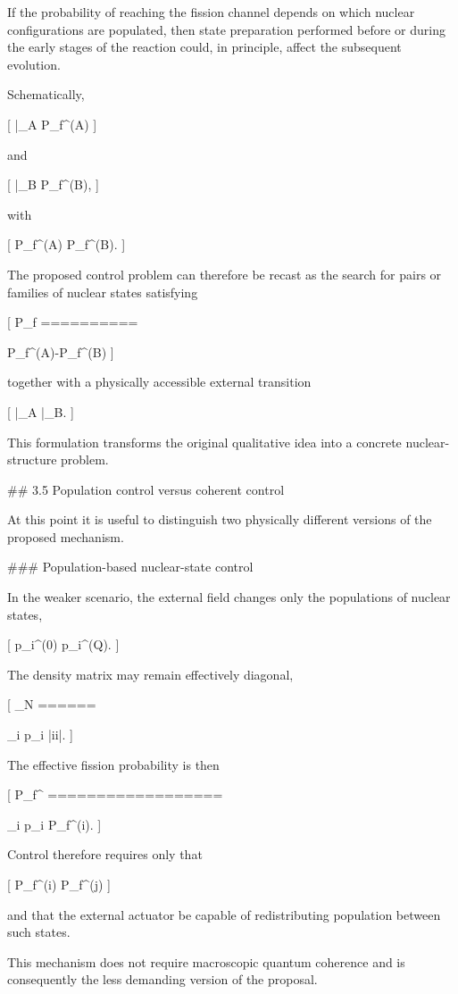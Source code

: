 If the probability of reaching the fission channel depends on which nuclear configurations are populated, then state preparation performed before or during the early stages of the reaction could, in principle, affect the subsequent evolution.

Schematically,

[
|\Psi_A\rangle
\longrightarrow
P_f^{(A)}
]

and

[
|\Psi_B\rangle
\longrightarrow
P_f^{(B)},
]

with

[
P_f^{(A)}
\neq
P_f^{(B)}.
]

The proposed control problem can therefore be recast as the search for pairs or families of nuclear states satisfying

[
\Delta P_f
==========

P_f^{(A)}-P_f^{(B)}
]

together with a physically accessible external transition

[
|\Psi_A\rangle
{}
|\Psi_B\rangle.
]

This formulation transforms the original qualitative idea into a concrete nuclear-structure problem.

## 3.5 Population control versus coherent control

At this point it is useful to distinguish two physically different versions of the proposed mechanism.

### Population-based nuclear-state control

In the weaker scenario, the external field changes only the populations of nuclear states,

[
p_i^{(0)}
\rightarrow
p_i^{(Q)}.
]

The density matrix may remain effectively diagonal,

[
\rho_N
======

\sum_i p_i |i\rangle\langle i|.
]

The effective fission probability is then

[
P_f^{}
==================

\sum_i p_i P_f^{(i)}.
]

Control therefore requires only that

[
P_f^{(i)}
\neq
P_f^{(j)}
]

and that the external actuator be capable of redistributing population between such states.

This mechanism does not require macroscopic quantum coherence and is consequently the less demanding version of the proposal.

